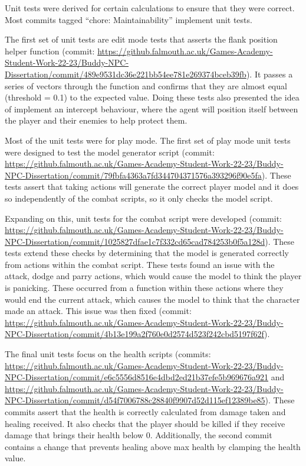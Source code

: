 \documentclass{IEEEtran}
\begin{document}
Unit tests were derived for certain calculations to ensure that they were correct. Most commits tagged “chore: Maintainability” implement unit tests.

The first set of unit tests are edit mode tests that asserts the flank position helper function (commit: \url{https://github.falmouth.ac.uk/Games-Academy-Student-Work-22-23/Buddy-NPC-Dissertation/commit/489e9531dc36e221bb54ee781e269374bceb39fb}). It passes a series of vectors through the function and confirms that they are almost equal (threshold = 0.1) to the expected value. Doing these tests also presented the idea of implement an intercept behaviour, where the agent will position itself between the player and their enemies to help protect them.

Most of the unit tests were for play mode. The first set of play mode unit tests were designed to test the model generator script (commit: \url{https://github.falmouth.ac.uk/Games-Academy-Student-Work-22-23/Buddy-NPC-Dissertation/commit/79fbfa4363a7fd344704371576a393296f90e5fa}). These tests assert that taking actions will generate the correct player model and it does so independently of the combat scripts, so it only checks the model script.

Expanding on this, unit tests for the combat script were developed (commit: \url{https://github.falmouth.ac.uk/Games-Academy-Student-Work-22-23/Buddy-NPC-Dissertation/commit/1025827dfae1c7f332cd65cad784253b0f5a128d}). These tests extend these checks by determining that the model is generated correctly from actions within the combat script. These tests found an issue with the attack, dodge and parry actions, which would cause the model to think the player is panicking. These occurred from a function within these actions where they would end the current attack, which causes the model to think that the character made an attack. This issue was then fixed (commit: \url{https://github.falmouth.ac.uk/Games-Academy-Student-Work-22-23/Buddy-NPC-Dissertation/commit/4b13e199a2f760e0d2574d523f242cbd5197f62f}).

The final unit tests focus on the health scripts (commits: \url{https://github.falmouth.ac.uk/Games-Academy-Student-Work-22-23/Buddy-NPC-Dissertation/commit/e6c5556d8516e4dbd2ed21b37efe5b969676a921} and \url{https://github.falmouth.ac.uk/Games-Academy-Student-Work-22-23/Buddy-NPC-Dissertation/commit/d54f7006788c28840f9907d52d115ef12389be85}). These commits assert that the health is correctly calculated from damage taken and healing received. It also checks that the player should be killed if they receive damage that brings their health below 0. Additionally, the second commit contains a change that prevents healing above max health by clamping the health value.
\end{document}
